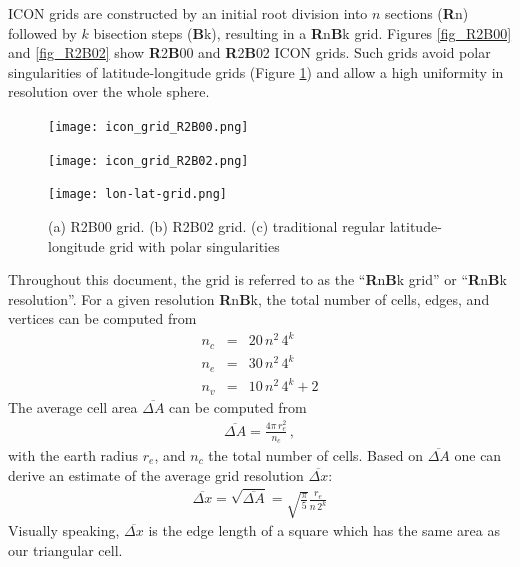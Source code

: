 ICON grids are constructed by an initial root division into $n$ sections (\textbf{R}n) followed by $k$ bisection steps (\textbf{B}k), 
resulting in a \textbf{R}n\textbf{B}k grid. Figures \ref{fig_R2B00} and \ref{fig_R2B02} show \textbf{R}2\textbf{B}00 and 
\textbf{R}2\textbf{B}02 ICON grids. Such grids avoid polar singularities of latitude-longitude grids (Figure \ref{fig_lonlat}) 
and allow a high uniformity in resolution over the whole sphere.

\begin{figure}[h]
  \begin{minipage}[b]{0.3\textwidth}
    \centering
    \texttt{[image: icon\_grid\_R2B00.png]}
    \subcaption{}\label{fig_R2B00}
  \end{minipage}\hfill
  \begin{minipage}[b]{0.3\textwidth}
    \centering
    \texttt{[image: icon\_grid\_R2B02.png]}
    \subcaption{}\label{fig_R2B02}
  \end{minipage}\hfill
  \begin{minipage}[b]{0.3\textwidth}
    \centering
    \texttt{[image: lon-lat-grid.png]}
    \subcaption{}\label{fig_lonlat}
  \end{minipage}\hfill
  \caption{(a) R2B00 grid. (b) R2B02 grid. (c) traditional regular latitude-longitude grid with polar singularities}
\end{figure}

Throughout this document, the grid is referred to as the ``\textbf{R}n\textbf{B}k grid'' or ``\textbf{R}n\textbf{B}k resolution''. For a given resolution \textbf{R}n\textbf{B}k, 
the total number of cells, edges, and vertices can be computed from
\begin{eqnarray*}
 n_{c} &=& 20\,n^{2}\,4^{k} \\
 n_{e} &=& 30\,n^{2}\,4^{k} \\
 n_{v} &=& 10\,n^{2}\,4^{k} + 2
\end{eqnarray*}
The average cell area $\overline{\Delta A}$ can be computed from
\begin{align*}
 \overline{\Delta A} = \frac{4\pi\,r_{e}^{2}}{n_{c}}\,,
\end{align*}
with the earth radius $r_{e}$, and $n_{c}$ the total number of cells. Based on $\overline{\Delta A}$ one can derive an estimate of the average grid resolution 
$\overline{\Delta x}$:
\begin{align*}
 \overline{\Delta x} = \sqrt{\overline{\Delta A}} = \sqrt{\frac{\pi}{5}} \frac{r_{e}}{n\,2^{k}}
\end{align*}
Visually speaking, $\overline{\Delta x}$ is the edge length of a square which has the same area as our triangular cell.


